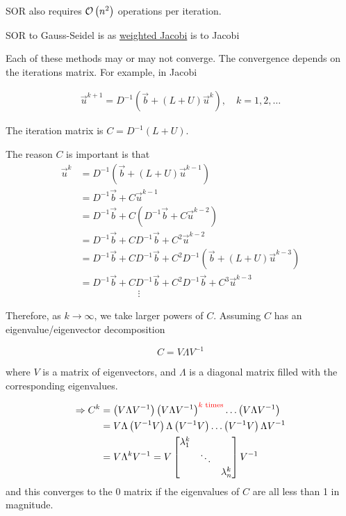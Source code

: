 SOR also requires $\mathcal{O}\left(n^2\right)$ operations per iteration. 

SOR to Gauss-Seidel is as \underline{weighted Jacobi} is to Jacobi


Each of these methods may or may not converge. The convergence depends on the
iterations matrix. For example, in Jacobi

\begin{align*}
\vec{u}^{k+1}=D^{-1} \left( \vec{b} + (L+U)\vec{u}^k \right), \quad k=1, 2, \ldots
\end{align*}

The iteration matrix is $C=D^{-1}(L+U)$.

The reason $C$ is important is that 
\begin{align*}
\vec{u}^{k} &= D^{-1} \left( \vec{b} + (L+U)\vec{u}^{k-1} \right) \\
            &= D^{-1}\vec{b} + C \vec{u}^{k-1} \\
            &= D^{-1}\vec{b} + C \left( D^{-1}\vec{b} + C \vec{u}^{k-2} \right) \\
            &= D^{-1}\vec{b} + C D^{-1}\vec{b} + C^2 \vec{u}^{k-2}  \\
            &= D^{-1}\vec{b} + C D^{-1}\vec{b} + C^2 D^{-1} \left( \vec{b} + (L+U)\vec{u}^{k-3} \right)  \\
            &= D^{-1}\vec{b} + C D^{-1}\vec{b} + C^2 D^{-1} \vec{b} + C^3\vec{u}^{k-3}   \\
  &\qquad \qquad\qquad \vdots
\end{align*}

Therefore, as $k\rightarrow\infty$, we take larger powers of $C$. Assuming $C$
has an eigenvalue/eigenvector decomposition


\begin{equation*}
C =  V\Lambda V^{-1}
\end{equation*}

where $V$ is a matrix of eigenvectors, and $\Lambda$ is a diagonal matrix filled
with the corresponding eigenvalues. 

\begin{align*}
\Rightarrow C^k &= \left( V\Lambda V^{-1} \right) 
\left( V\Lambda V^{-1} \right)^{\textcolor{red}{k\text{ times}}} \ldots 
                  \left( V\Lambda V^{-1} \right)\\
&= V \Lambda \left( V^{-1} V \right) \Lambda \left( V^{-1} V \right)
  \ldots  \left( V^{-1} V \right) \Lambda  V^{-1} \\ 
&= V \Lambda^k V^{-1} = V \begin{bmatrix}
  \lambda_1^k & & \\
  & \ddots & \\
  && \lambda_n^k
\end{bmatrix}
     V^{-1}
\end{align*}
and this converges to the 0 matrix if the eigenvalues of $C$ are all less than 1
in magnitude.

